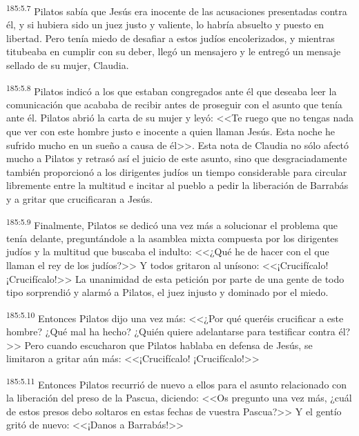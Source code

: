 \par 
\textsuperscript{185:5.7} Pilatos sabía que Jesús era inocente de las acusaciones presentadas contra él, y si hubiera sido un juez justo y valiente, lo habría absuelto y puesto en libertad. Pero tenía miedo de desafiar a estos judíos encolerizados, y mientras titubeaba en cumplir con su deber, llegó un mensajero y le entregó un mensaje sellado de su mujer, Claudia.

\par 
\textsuperscript{185:5.8} Pilatos indicó a los que estaban congregados ante él que deseaba leer la comunicación que acababa de recibir antes de proseguir con el asunto que tenía ante él. Pilatos abrió la carta de su mujer y leyó: <<Te ruego que no tengas nada que ver con este hombre justo e inocente a quien llaman Jesús. Esta noche he sufrido mucho en un sueño a causa de él>>. Esta nota de Claudia no sólo afectó mucho a Pilatos y retrasó así el juicio de este asunto, sino que desgraciadamente también proporcionó a los dirigentes judíos un tiempo considerable para circular libremente entre la multitud e incitar al pueblo a pedir la liberación de Barrabás y a gritar que crucificaran a Jesús.

\par 
\textsuperscript{185:5.9} Finalmente, Pilatos se dedicó una vez más a solucionar el problema que tenía delante, preguntándole a la asamblea mixta compuesta por los dirigentes judíos y la multitud que buscaba el indulto: <<¿Qué he de hacer con el que llaman el rey de los judíos?>> Y todos gritaron al unísono: <<¡Crucifícalo! ¡Crucifícalo!>> La unanimidad de esta petición por parte de una gente de todo tipo sorprendió y alarmó a Pilatos, el juez injusto y dominado por el miedo.

\par 
\textsuperscript{185:5.10} Entonces Pilatos dijo una vez más: <<¿Por qué queréis crucificar a este hombre? ¿Qué mal ha hecho? ¿Quién quiere adelantarse para testificar contra él?>> Pero cuando escucharon que Pilatos hablaba en defensa de Jesús, se limitaron a gritar aún más: <<¡Crucifícalo! ¡Crucifícalo!>>

\par 
\textsuperscript{185:5.11} Entonces Pilatos recurrió de nuevo a ellos para el asunto relacionado con la liberación del preso de la Pascua, diciendo: <<Os pregunto una vez más, ¿cuál de estos presos debo soltaros en estas fechas de vuestra Pascua?>> Y el gentío gritó de nuevo: <<¡Danos a Barrabás!>>

